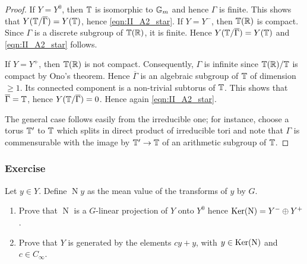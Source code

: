 \begin{subappendices}
\begin{proof}
	If $Y = Y^0$, then $\mathbb{T}$ is isomorphic to $\mathbb{G}_m$ and hence $\Gamma$ is
	finite.  This shows that $Y(\mathbb{T}/\overline{\Gamma}) = Y(\mathbb{T})$, hence
	\eqref{eqn:II_A2_star}. If $Y = Y^-$, then $\mathbb{T}(\mathbb{R})$ is compact. Since
	$\Gamma$ is a discrete subgroup of $\mathbb{T}(\mathbb{R})$, it is finite.  Hence
	$Y(\mathbb{T}/\overline{\Gamma}) = Y(\mathbb{T})$ and \eqref{eqn:II_A2_star} follows.

	If $Y = Y^+$, then $\mathbb{T}(\mathbb{R})$ is not compact. Consequently, $\Gamma$ is
	infinite since $\mathbb{T}(\mathbb{R})/\mathbb{T}$ is compact by Ono's theorem. Hence
	$\overline{\Gamma}$ is an algebraic subgroup of $\mathbb{T}$ of dimension $\ge
	1$. Its connected component is a non-trivial subtorus of $\mathbb{T}$. This
	shows that $\overline{\Gamma} = \mathbb{T}$, hence $Y(\mathbb{T}/\overline{\Gamma}) =
	0$. Hence again \eqref{eqn:II_A2_star}.

	The general case follows easily from the irreducible one; for
	\dpage
	instance, choose a torus $\mathbb{T}'$ to $\mathbb{T}$ which splits in direct product
	of irreducible tori and note that $\Gamma$ is commensurable with the
	image by $\mathbb{T}' \to \mathbb{T}$ of an arithmetic subgroup of $\mathbb{T}$.
\end{proof}

\subsubsection*{Exercise}
Let $y \in Y$. Define $\operatorname{N} y$ as the mean value of the transforms of
$y$ by $G$.
\begin{enumerate}[label=\textit{\alph*}.]
\item Prove that $\operatorname{N}$ is a $G$-linear projection of $Y$ onto
	$Y^0$ hence $\operatorname{Ker}(\operatorname{N}) = Y^- \oplus Y^+$.
\item Prove that $Y$ is generated by the elements $cy + y$, with $y \in
	\operatorname{Ker}(\operatorname{N})$ and $c \in C_\infty$.
\end{enumerate}
\end{subappendices}
